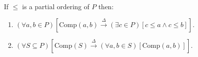 If $\leq$ is a partial ordering of $P$ then:
\begin{enumerate}
\item $(\forall a, b \in P)[\text{Comp}(a, b) \xrightarrow{\Delta} (\exists c \in P)[c \leq a \land c \leq b]]$.
\item $(\forall S \subseteq P)[\text{Comp}(S) \xrightarrow{\Delta} (\forall a, b \in S)[\text{Comp}(a, b)]]$.
\end{enumerate}
